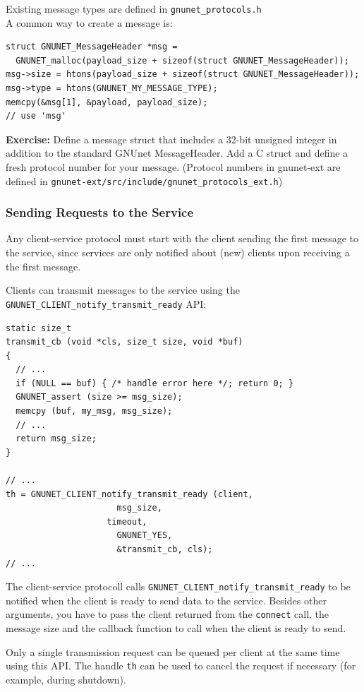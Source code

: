 \documentclass[10pt]{article}
\newcommand{\exercise}[1]{\noindent\begin{boxedminipage}{\textwidth}{\bf Exercise:} #1 \end{boxedminipage}}
\begin{document}
Existing message types are defined in {\tt gnunet\_protocols.h}\\
A common way to create a message is:

\lstset{language=c}
\begin{lstlisting}
struct GNUNET_MessageHeader *msg =
  GNUNET_malloc(payload_size + sizeof(struct GNUNET_MessageHeader));
msg->size = htons(payload_size + sizeof(struct GNUNET_MessageHeader));
msg->type = htons(GNUNET_MY_MESSAGE_TYPE);
memcpy(&msg[1], &payload, payload_size);
// use 'msg'
\end{lstlisting}

\exercise{Define a message struct that includes a 32-bit
unsigned integer in addition to the standard GNUnet MessageHeader.
Add a C struct and define a fresh protocol number for your message.
(Protocol numbers in gnunet-ext are defined in \lstinline|gnunet-ext/src/include/gnunet_protocols_ext.h|)}


\subsubsection{Sending Requests to the Service}

Any client-service protocol must start with the client sending the
first message to the service, since services are only notified about
(new) clients upon receiving a the first message.

Clients can transmit messages to the service using the
{\tt GNUNET\_CLIENT\_notify\_transmit\_ready} API:
\lstset{language=c}
\begin{lstlisting}
static size_t
transmit_cb (void *cls, size_t size, void *buf)
{
  // ...
  if (NULL == buf) { /* handle error here */; return 0; }
  GNUNET_assert (size >= msg_size);
  memcpy (buf, my_msg, msg_size);
  // ...
  return msg_size;
}

// ...
th = GNUNET_CLIENT_notify_transmit_ready (client,
					  msg_size,
 				    timeout,
					  GNUNET_YES,
					  &transmit_cb, cls);
// ...
\end{lstlisting}

The client-service protocoll calls {\tt GNUNET\_CLIENT\_notify\_transmit\_ready}
to be notified when the client is ready to send data to the service.
Besides other arguments, you have to pass the client returned
from the {\tt connect} call, the message size and the callback function to
call when the client is ready to send.

Only a single transmission request can be queued per client at the
same time using this API.  The handle {\tt th} can be used to cancel
the request if necessary (for example, during shutdown).
\end{document}
